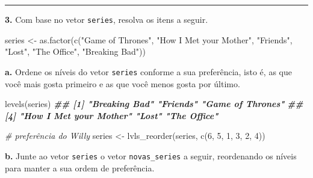 \documentclass[
]{book}
\newenvironment{Shaded}{\begin{snugshade}}{\end{snugshade}}
\newcommand{\CommentTok}[1]{\textcolor[rgb]{0.56,0.35,0.01}{\textit{#1}}}
\newcommand{\DecValTok}[1]{\textcolor[rgb]{0.00,0.00,0.81}{#1}}
\newcommand{\DocumentationTok}[1]{\textcolor[rgb]{0.56,0.35,0.01}{\textbf{\textit{#1}}}}
\newcommand{\FunctionTok}[1]{\textcolor[rgb]{0.00,0.00,0.00}{#1}}
\newcommand{\NormalTok}[1]{#1}
\newcommand{\OtherTok}[1]{\textcolor[rgb]{0.56,0.35,0.01}{#1}}
\newcommand{\StringTok}[1]{\textcolor[rgb]{0.31,0.60,0.02}{#1}}
\begin{document}
\begin{center}\rule{0.5\linewidth}{0.5pt}\end{center}

\textbf{3.} Com base no vetor \texttt{series}, resolva os itens a seguir.

\begin{Shaded}
\begin{Highlighting}[]
\NormalTok{series }\OtherTok{\textless{}{-}} \FunctionTok{as.factor}\NormalTok{(}\FunctionTok{c}\NormalTok{(}\StringTok{"Game of Thrones"}\NormalTok{, }\StringTok{"How I Met your Mother"}\NormalTok{, }\StringTok{"Friends"}\NormalTok{, }\StringTok{"Lost"}\NormalTok{, }\StringTok{"The Office"}\NormalTok{, }\StringTok{"Breaking Bad"}\NormalTok{))}
\end{Highlighting}
\end{Shaded}

\textbf{a.} Ordene os níveis do vetor \texttt{series} conforme a sua preferência, isto é, as que você mais gosta primeiro e as que você menos gosta por último.

\begin{Shaded}
\begin{Highlighting}[]
\FunctionTok{levels}\NormalTok{(series)}
\DocumentationTok{\#\# [1] "Breaking Bad"          "Friends"               "Game of Thrones"      }
\DocumentationTok{\#\# [4] "How I Met your Mother" "Lost"                  "The Office"}

\CommentTok{\# preferência do Willy}
\NormalTok{series }\OtherTok{\textless{}{-}} \FunctionTok{lvls\_reorder}\NormalTok{(series, }\FunctionTok{c}\NormalTok{(}\DecValTok{6}\NormalTok{, }\DecValTok{5}\NormalTok{, }\DecValTok{1}\NormalTok{, }\DecValTok{3}\NormalTok{, }\DecValTok{2}\NormalTok{, }\DecValTok{4}\NormalTok{))}
\end{Highlighting}
\end{Shaded}

\textbf{b.} Junte ao vetor \texttt{series} o vetor \texttt{novas\_series} a seguir, reordenando os níveis para manter a sua ordem de preferência.
\end{document}
